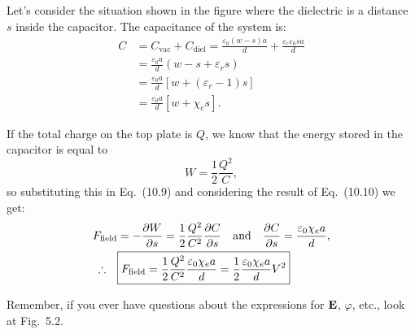 Let's consider the situation shown in the figure where the dielectric is a distance $s$ inside the capacitor. The capacitance of the system is:
\begin{align}
    C &= C_{\text{vac}} + C_{\text{diel}} = \frac{\varepsilon_0(w - s)a}{d} + \frac{\varepsilon_r \varepsilon_0 s a}{d} \nonumber \\
      &= \frac{\varepsilon_0 a}{d}\left(w - s + \varepsilon_r s\right) \nonumber \\
      &= \frac{\varepsilon_0 a}{d}\left[w + (\varepsilon_r - 1)s\right] \nonumber \\
      &= \frac{\varepsilon_0 a}{d}\left[w + \chi_e s\right].
\end{align}

If the total charge on the top plate is $Q$, we know that the energy stored in the capacitor is equal to
\begin{equation*}
    W = \frac{1}{2}\frac{Q^2}{C},
\end{equation*}
so substituting this in Eq.~(10.9) and considering the result of Eq.~(10.10) we get:
\begin{align*}
    F_{\text{field}} &= -\pdv{W}{s} = \frac{1}{2}\frac{Q^2}{C^2}\pdv{C}{s} \quad \text{and} \quad \pdv{C}{s} = \frac{\varepsilon_0 \chi_e a}{d}, \\
    \therefore \quad &\boxed{F_{\text{field}} = \frac{1}{2}\frac{Q^2}{C^2}\frac{\varepsilon_0 \chi_e a}{d} = \frac{1}{2}\frac{\varepsilon_0 \chi_e a}{d}V^2}
\end{align*}

\begin{remark}
Remember, if you ever have questions about the expressions for $\vb{E}$, $\varphi$, etc., look at Fig.~5.2.
\end{remark}